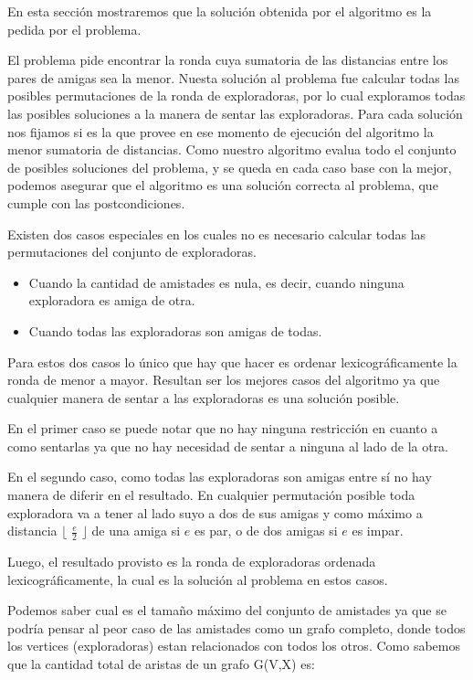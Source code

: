 \documentclass[11pt]{article}
\begin{document}
En esta sección mostraremos que la solución obtenida por el algoritmo es la pedida por el problema. 

El problema pide encontrar la ronda cuya sumatoria de las distancias entre los pares de amigas sea la menor.
Nuesta solución al problema fue calcular todas las posibles permutaciones de la ronda de exploradoras, por lo cual 
exploramos todas las posibles soluciones a la manera de sentar las exploradoras. Para cada solución nos fijamos 
si es la que provee en ese momento de ejecución del algoritmo la menor sumatoria de distancias. Como nuestro 
algoritmo evalua todo el conjunto de posibles soluciones del problema, y se queda en cada caso base con la mejor,
podemos asegurar que el algoritmo es una solución correcta al problema, que cumple con las postcondiciones.

Existen dos casos especiales en los cuales no es necesario calcular todas las permutaciones del conjunto de exploradoras.
\begin{itemize}
  \item Cuando la cantidad de amistades es nula, es decir, cuando ninguna exploradora es amiga de otra.
  \item Cuando todas las exploradoras son amigas de todas.
\end{itemize}
Para estos dos casos lo único que hay que hacer es ordenar lexicográficamente la ronda de menor a mayor. 
Resultan ser los mejores casos del algoritmo ya que cualquier manera de sentar a las exploradoras 
es una solución posible.

En el primer caso se puede notar que no hay ninguna restricción en cuanto a como sentarlas 
ya que no hay necesidad de sentar a ninguna al lado de la otra.

En el segundo caso, como todas las exploradoras 
son amigas entre sí no hay manera de diferir en el resultado. En cualquier permutación posible toda exploradora va a tener al lado suyo 
a dos de sus amigas y como máximo a distancia $\lfloor$ $\frac{e}{2}$ $\rfloor$ de una amiga si $e$ es par, o de 
dos amigas si $e$ es impar. 

Luego, el resultado provisto es la ronda de exploradoras ordenada lexicográficamente, la cual es la solución 
al problema en estos casos.

Podemos saber cual es el tamaño máximo del conjunto de amistades ya que 
se podría pensar al peor caso de las amistades como un grafo completo, donde todos los vertices (exploradoras) estan
relacionados con todos los otros. Como sabemos que la cantidad total de aristas de un grafo G(V,X) es:
\end{document}
